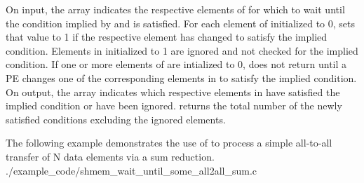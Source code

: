 \begin{apidefinition}
{    On input, the  array indicates the respective elements of
     for which to wait until the condition implied by  and
     is satisfied.  For each element of 
    initialized to 0,  sets that value to 1 if
    the respective  element has changed to satisfy the implied
    condition. Elements in  initialized to 1 are ignored and not
    checked for the implied condition.  If one or more elements of
     are intialized to 0,  does not
    return until a \ac{PE} changes one of the corresponding elements in
     to satisfy the implied condition.  On output, the 
    array indicates which respective elements in  have satisfied the
    implied condition or have been ignored.  
    returns the total number of the newly satisfied conditions excluding the
    ignored elements.
}






\begin{apiexamples}

\apicexample
{The following \CorCpp{} example demonstrates the use of 
 to process a simple all-to-all transfer of N data elements via a sum reduction.}
{./example_code/shmem_wait_until_some_all2all_sum.c}
{}

\end{apiexamples}

\end{apidefinition}
